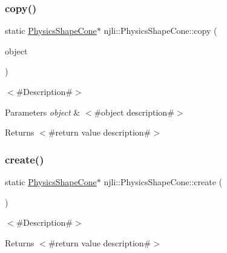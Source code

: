\subsubsection{\texorpdfstring{copy()}{copy()}}
{\footnotesize\ttfamily static \mbox{\hyperlink{classnjli_1_1_physics_shape_cone}{Physics\+Shape\+Cone}}$\ast$ njli\+::\+Physics\+Shape\+Cone\+::copy (\begin{DoxyParamCaption}\item[{const \mbox{\hyperlink{classnjli_1_1_physics_shape_cone}{Physics\+Shape\+Cone}} \&}]{object }\end{DoxyParamCaption})\hspace{0.3cm}{\ttfamily [static]}}

$<$\#\+Description\#$>$


\begin{DoxyParams}{Parameters}
{\em object} & $<$\#object description\#$>$\\
\hline
\end{DoxyParams}
\begin{DoxyReturn}{Returns}
$<$\#return value description\#$>$ 
\end{DoxyReturn}
\mbox{\label{classnjli_1_1_physics_shape_cone_af0f9059a4769091de3f7191544323904}} 
\subsubsection{\texorpdfstring{create()}{create()}\hspace{0.1cm}{\footnotesize\ttfamily [1/2]}}
{\footnotesize\ttfamily static \mbox{\hyperlink{classnjli_1_1_physics_shape_cone}{Physics\+Shape\+Cone}}$\ast$ njli\+::\+Physics\+Shape\+Cone\+::create (\begin{DoxyParamCaption}{ }\end{DoxyParamCaption})\hspace{0.3cm}{\ttfamily [static]}}

$<$\#\+Description\#$>$

\begin{DoxyReturn}{Returns}
$<$\#return value description\#$>$ 
\end{DoxyReturn}
\mbox{\label{classnjli_1_1_physics_shape_cone_a01d3c914e19d5d4e539f1f5440f94d78}} 
